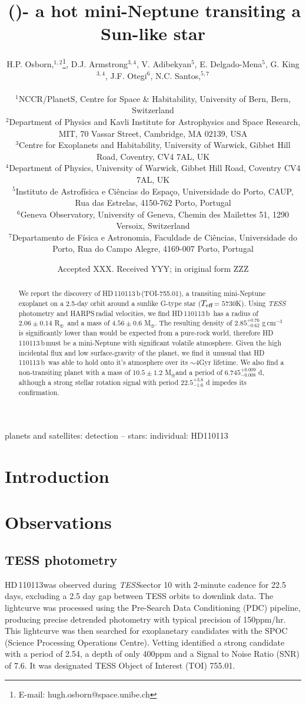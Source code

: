 \documentclass[fleqn,usenatbib]{mnras}
\title[\Tplanet]{\Tplanet\,(\TTplanet)- a hot mini-Neptune transiting a Sun-like star}
\author[H.P. Osborn et al.]{
\parbox{\textwidth}{H.P. Osborn,$^{{1},{2}}$\thanks{E-mail: hugh.osborn@space.unibe.ch},
D.J. Armstrong$^{3,4}$, %
V. Adibekyan$^{5}$, %
E. Delgado-Mena$^{5}$,
G. King$^{3,4}$, %
J.F. Otegi$^{6}$, %
N.C. Santos,$^{5,7}$ %
 }\\
$^{1}$NCCR/PlanetS, Centre for Space \& Habitability, University of Bern, Bern, Switzerland\\
$^{2}$Department of Physics and Kavli Institute for Astrophysics and Space Research, MIT, 70 Vassar Street, Cambridge, MA 02139, USA\\
$^{3}$Centre for Exoplanets and Habitability, University of Warwick, Gibbet Hill Road, Coventry, CV4 7AL, UK\\
$^{4}$Department of Physics, University of Warwick, Gibbet Hill Road, Coventry CV4 7AL, UK \\
$^{5}$Instituto de Astrof\'isica e Ci\^encias do Espa\c{c}o, Universidade do Porto, CAUP, Rua das Estrelas, 4150-762 Porto, Portugal\\
$^{6}$Geneva Observatory, University of Geneva, Chemin des Mailettes 51, 1290 Versoix, Switzerland\\
$^{7}$Departamento de F\'isica e Astronomia, Faculdade de Ci\^{e}ncias, Universidade do Porto, Rua do Campo Alegre, 4169-007 Porto, Portugal\\
}
\date{Accepted XXX. Received YYY; in original form ZZZ}
\newcommand{\gcm}{g\,cm$^{-3}$}	%
\newcommand{\tess}{{\it TESS}}
\newcommand{\harps}{{HARPS}}
\newcommand{\rearth}{R$_{\oplus}$}
\newcommand{\mearth}{M$_{\oplus}$}
\newcommand{\teff}{$T_{\rm eff}$}
\newcommand{\TPone}{ $ 6.745^{+0.009}_{-0.008} $ }
\newcommand{\TMpzero}{ $ 4.56 \pm 0.6 $ }
\newcommand{\TMpone}{ $ 10.5 \pm 1.2 $ }
\newcommand{\Trplzero}{ $ 2.06 \pm 0.14 $ }
\newcommand{\Trhopgcmthreezero}{ $ 2.85^{+0.76}_{-0.62} $ }
\newcommand{\Tperiod}{ $ 22.5^{+3.8}_{-1.6} $ }
\newcommand{\TTplanet}{TOI-755.01}
\newcommand{\Tstar}{HD\,110113}
\newcommand{\Tplanet}{HD\,110113\,b}
\begin{document}
\label{firstpage}
\pagerange{\pageref{firstpage}--\pageref{lastpage}}
\maketitle

\begin{abstract}
We report the discovery of \Tplanet\,(\TTplanet), a transiting mini-Neptune exoplanet on a 2.5-day orbit around a sunlike G-type star (\teff= $5730$K).
Using \tess\,photometry and \harps\,radial velocities, we find \Tplanet\, has a radius of \Trplzero \rearth\, and a mass of \TMpzero \mearth.
The resulting density of \Trhopgcmthreezero\gcm\,is significantly lower than would be expected from a pure-rock world, therefore \Tplanet\,must be a mini-Neptune with significant volatile atmosphere.
Given the high incidental flux and low surface-gravity of the planet, we find it unusual that \Tplanet\, was able to hold onto it's atmosphere over its $\sim4$Gyr lifetime.
We also find a non-transiting planet with a mass of \TMpone \mearth and a period of \TPone d, although a strong stellar rotation signal with period \Tperiod d impedes its confirmation.
\end{abstract}

\begin{keywords}
planets and satellites: detection -- stars: individual: HD110113
\end{keywords}



\section{Introduction}


\section{Observations}

\subsection{TESS photometry}
\Tstar was observed during \tess sector 10 with 2-minute cadence for 22.5 days, excluding a 2.5 day gap between TESS orbits to downlink data.
The lightcurve was processed using the Pre-Search Data Conditioning (PDC) pipeline, producing precise detrended photometry with typical precision of 150ppm/hr.
This lightcurve was then searched for exoplanetary candidates with the SPOC (Science Processing Operations Centre).
Vetting identified a strong candidate with a period of 2.54, a depth of only 400ppm and a Signal to Noise Ratio (SNR) of 7.6.
It was designated TESS Object of Interest (TOI) 755.01. 
\end{document}
